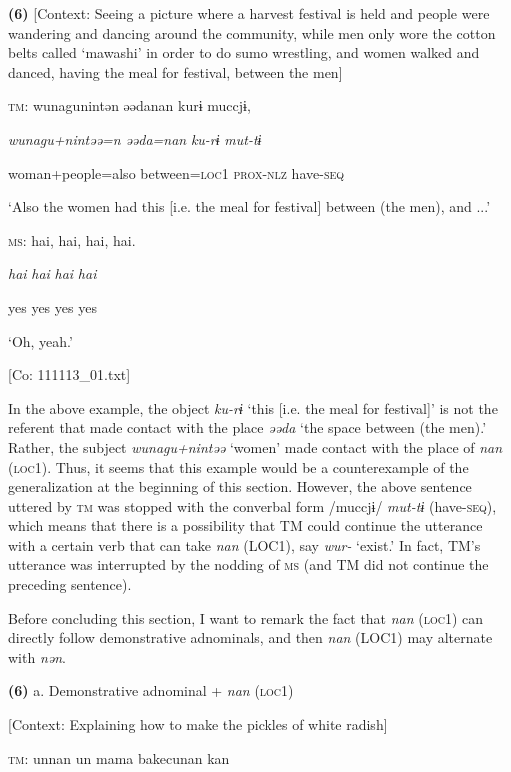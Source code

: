 \textbf{(6)}  [Context: Seeing a picture where a harvest festival is held and people were wandering and dancing around the community, while men only wore the cotton belts called ‘mawashi’ in order to do sumo wrestling, and women walked and danced, having the meal for festival, between the men]

  \textsc{tm}:  wunagunintən  əədanan  kurɨ  muccjɨ,

    \textit{wunagu+nintəə=n}  \textit{əəda=nan}  \textit{ku-rɨ}  \textit{mut-tɨ}

    woman+people=also  between=\textsc{loc}1  \textsc{prox}-\textsc{nlz}  have-\textsc{seq}

    ‘Also the women had this [i.e. the meal for festival] between (the men), and ...’

  \textsc{ms}:  {\textbar}hai,  hai,  hai,  hai.{\textbar}

    \textit{hai}  \textit{hai}  \textit{hai}  \textit{hai}

    yes  yes  yes  yes

    ‘Oh, yeah.’

    [Co: 111113\_01.txt]

In the above example, the object \textit{ku-rɨ} ‘this [i.e. the meal for festival]’ is not the referent that made contact with the place \textit{əəda} ‘the space between (the men).’ Rather, the subject \textit{wunagu+nintəə} ‘women’ made contact with the place of \textit{nan} (\textsc{loc}1). Thus, it seems that this example would be a counterexample of the generalization at the beginning of this section. However, the above sentence uttered by \textsc{tm} was stopped with the converbal form /muccjɨ/ \textit{mut-tɨ} (have-\textsc{seq}), which means that there is a possibility that TM could continue the utterance with a certain verb that can take \textit{nan} (LOC1), say \textit{wur-} ‘exist.’ In fact, TM’s utterance was interrupted by the nodding of \textsc{ms} (and TM did not continue the preceding sentence).

Before concluding this section, I want to remark the fact that \textit{nan} (\textsc{loc}1) can directly follow demonstrative adnominals, and then \textit{nan} (LOC1) may alternate with \textit{nən}.

\textbf{(6)}  a.  Demonstrative adnominal + \textit{nan} (\textsc{loc}1)

    [Context: Explaining how to make the pickles of white radish]

    \textsc{tm}:  unnan  un  mama  {\textbar}bakecu{\textbar}nan  kan

